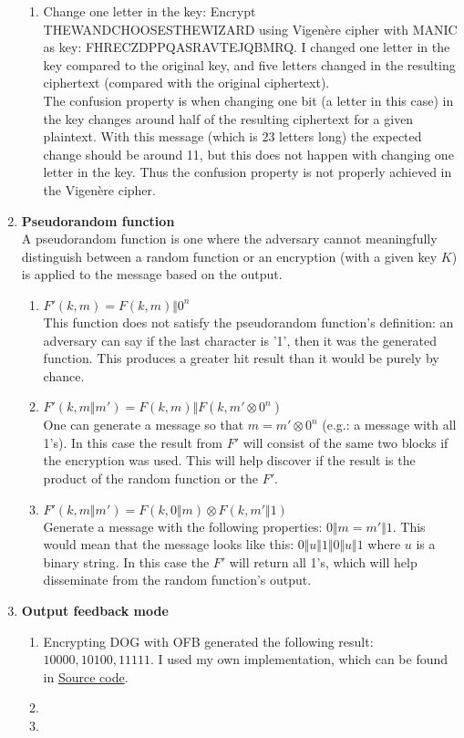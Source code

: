 \documentclass{article}
\begin{document}
\begin{enumerate}[label=\textbf{Task \arabic*:}]
\begin{enumerate}[label=\textit{Part \roman*:}]
			\item Change one letter in the key: Encrypt \textsc{THEWANDCHOOSESTHEWIZARD} using Vigenère cipher with \textsc{MANIC} as key: \textsc{FHRECZDPPQASRAVTEJQBMRQ}. I changed one letter in the key compared to the original key, and five letters changed in the resulting ciphertext (compared with the original ciphertext).\\
			The confusion property is when changing one bit (a letter in this case) in the key changes around half of the resulting ciphertext for a given plaintext. With this message (which is 23 letters long) the expected change should be around 11, but this does not happen with changing one letter in the key. Thus the confusion property is not properly achieved in the Vigenère cipher.	
		\end{enumerate}
		\item \textbf{Pseudorandom function} \\
		A pseudorandom function is one where the adversary cannot meaningfully distinguish between a random function or an encryption (with a given key $K$) is applied to the message based on the output.
		\begin{enumerate}[label=-]
			\item $ F'(k, m) = F(k, m) \Vert 0^n $ \\
			This function does not satisfy the pseudorandom function's definition: an adversary can say if the last character is '1', then it was the generated function. This produces a greater hit result than it would be purely by chance.
			\item $ F'(k, m \Vert m') = F(k, m) \Vert F(k, m' \otimes 0^n) $ \\
			One can generate a message so that $m = m' \otimes 0^n$ (e.g.: a message with all 1's). In this case the result from $F'$ will consist of the same two blocks if the encryption was used. This will help discover if the result is the product of the random function or the $F'$.
			\item $ F'(k, m \Vert m') = F(k, 0 \Vert m) \otimes F(k, m' \Vert 1) $\\
			Generate a message with the following properties: $ 0 \Vert m = m' \Vert 1 $. This would mean that the message looks like this: $ 0 \Vert u \Vert 1 \Vert 0 \Vert u \Vert 1 $ where $u$ is a binary string. In this case the $F'$ will return all 1's, which will help disseminate from the random function's output.
		\end{enumerate}
		\item \textbf{Output feedback mode}\\
		\begin{enumerate}[label=\textit{Part \roman*:}]
			\item Encrypting \textsc{DOG} with OFB generated the following result: $10000, 10100, 11111$. I used my own implementation, which can be found in \hyperlink{https://github.com/halkszavu/Encryption-Homework-2025}{Source code}.
			\item 
			\item 
		\end{enumerate}
		

\end{enumerate}
\end{document}
